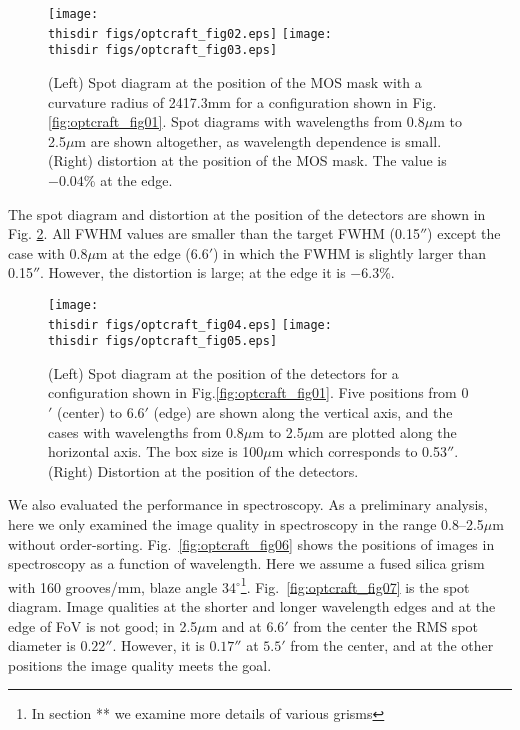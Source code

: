 \begin{figure}[!ht]
\centerline{
\texttt{[image: \\thisdir figs/optcraft\_fig02.eps]}
 \texttt{[image: \\thisdir figs/optcraft\_fig03.eps]}
}
\caption{(Left) Spot diagram at the position of the MOS mask with a
 curvature radius of 2417.3mm for a configuration shown in 
Fig.\ref{fig:optcraft_fig01}. Spot diagrams with wavelengths from
 0.8$\mu$m to 2.5$\mu$m are shown altogether, as wavelength dependence
 is small. (Right) distortion at the
 position of the MOS mask. The value is $-0.04$\% at the edge.
}
\label{fig:optcraft_fig02}
\end{figure}

The spot diagram and distortion at the position of the detectors are
shown in Fig. \ref{fig:optcraft_fig04}. All FWHM values are smaller than
the target FWHM (0.15$''$) except the case with 0.8$\mu$m
at the edge ($6.6'$) in which the FWHM is slightly larger than
0.15$''$. However, the distortion is large; at the edge it is 
$-6.3$\%.

\begin{figure}[!ht]
\centerline{
\texttt{[image: \\thisdir figs/optcraft\_fig04.eps]}
\texttt{[image: \\thisdir figs/optcraft\_fig05.eps]}
}
\caption{(Left) Spot diagram at the position of the detectors for a
 configuration shown in Fig.\ref{fig:optcraft_fig01}.
Five positions from 0$'$ (center) to 6.6$'$ (edge) are shown along the
 vertical axis, and the cases with wavelengths from 0.8$\mu$m to
 2.5$\mu$m are plotted along the horizontal axis. 
The box size is 100$\mu$m which corresponds to 0.53$''$.
(Right) Distortion at the position of the detectors.
}
\label{fig:optcraft_fig04}
\end{figure}


We also evaluated the performance in spectroscopy. As a preliminary
analysis, here we only examined the image quality in spectroscopy in the
range 0.8--2.5$\mu$m without order-sorting.
Fig.~\ref{fig:optcraft_fig06} shows the positions of images in
spectroscopy as a function of wavelength.
Here we assume a fused silica grism with 160 grooves/mm, blaze angle 
34$^\circ$\footnote{In section ** we examine more details of various
grisms}.
Fig.~\ref{fig:optcraft_fig07} is the spot diagram. Image qualities at
the shorter and longer wavelength edges and at the edge of FoV is not
good; in 2.5$\mu$m and at $6.6'$ from the center the RMS spot diameter
is $0.22''$. However, it is $0.17''$ at $5.5'$ from the center, and
at the other positions the image quality meets the goal.


